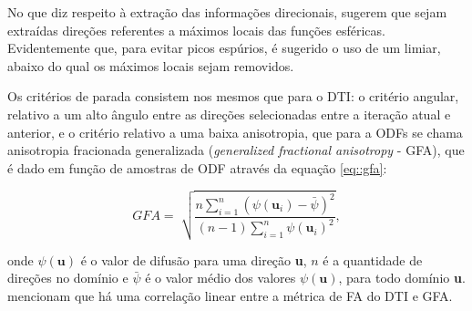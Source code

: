\documentclass[
    12pt,                %
    oneside,            %
    a4paper,            %
    english,            %
    french,                %
    spanish,            %
    brazil                %
    ]{abntex2}
\begin{document}
No que diz respeito à extração das informações direcionais,  sugerem que sejam extraídas direções referentes a máximos locais das funções esféricas. Evidentemente que, para evitar picos espúrios, é sugerido o uso de um limiar, abaixo do qual os máximos locais sejam removidos.

Os critérios de parada consistem nos mesmos que para o DTI: o critério angular, relativo a um alto ângulo entre as direções selecionadas entre a iteração atual e anterior, e o critério relativo a uma baixa anisotropia, que para a ODFs se chama anisotropia fracionada generalizada (\textit{generalized fractional anisotropy} - GFA), que é dado em função de amostras de ODF através da equação \ref{eq::gfa}:

\begin{equation}
\label{eq::gfa}
    GFA = \sqrt[]{\frac{n\sum_{i=1}^{n} (\psi(\textbf{u}_i) - \bar{\psi})^2}{(n-1)\sum_{i=1}^{n} \psi(\textbf{u}_i)^2}} ,
\end{equation}

onde $\psi(\textbf{u})$ é o valor de difusão para uma direção \textbf{u}, $n$ é a quantidade de direções no domínio e  $\bar{\psi}$ é o valor médio dos valores $\psi(\textbf{u})$, para todo domínio \textbf{u}.  mencionam que há uma correlação linear entre a métrica de FA do DTI e GFA.




\end{document}
